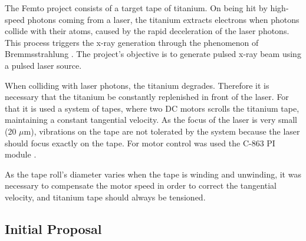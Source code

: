 \documentclass[journal]{IEEEtran}
\begin{document}
The Femto project consists of a target tape of titanium. On being hit by high-speed photons coming from a laser, the titanium extracts electrons when photons collide with their atoms, caused by the rapid deceleration of the laser photons. This process triggers the x-ray generation through the phenomenon of Bremmsstrahlung \cite{IEEEhowto:Bremmsstrahlung}. The project's objective is to generate pulsed x-ray beam using a pulsed laser source.


When colliding with laser photons, the titanium degrades. Therefore it is necessary that the titanium be constantly replenished in front of the laser. For that it is used a system of tapes, where two DC motors \cite{IEEEhowto:motor} scrolls the titanium tape, maintaining a constant tangential velocity. As the focus of the laser is very small (20 $\mu$m), vibrations on the tape are not tolerated by the system because the laser should focus exactly on the tape.
For motor control was used the C-863 PI module \cite {IEEEhowto:PI}.


As the tape roll’s diameter varies when the tape is winding and unwinding, it was necessary to compensate the motor speed in order to correct the tangential velocity, and titanium tape should always be tensioned.

\subsection{Initial Proposal}

\end{document}
